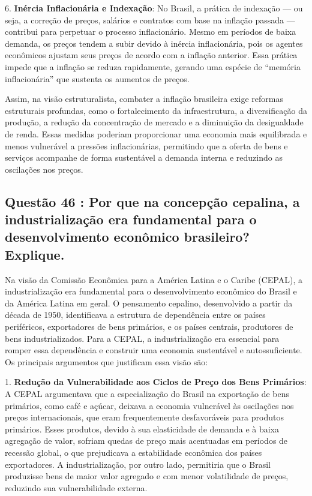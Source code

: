 \documentclass[a4paper,12pt]{article}[abntex2]
\begin{document}
6. \textbf{Inércia Inflacionária e Indexação}: No Brasil, a prática de indexação — ou seja, a correção de preços, salários e contratos com base na inflação passada — contribui para perpetuar o processo inflacionário. Mesmo em períodos de baixa demanda, os preços tendem a subir devido à inércia inflacionária, pois os agentes econômicos ajustam seus preços de acordo com a inflação anterior. Essa prática impede que a inflação se reduza rapidamente, gerando uma espécie de “memória inflacionária” que sustenta os aumentos de preços.

Assim, na visão estruturalista, combater a inflação brasileira exige reformas estruturais profundas, como o fortalecimento da infraestrutura, a diversificação da produção, a redução da concentração de mercado e a diminuição da desigualdade de renda. Essas medidas poderiam proporcionar uma economia mais equilibrada e menos vulnerável a pressões inflacionárias, permitindo que a oferta de bens e serviços acompanhe de forma sustentável a demanda interna e reduzindo as oscilações nos preços.

\subsection{\textbf{Questão 46 : Por que na concepção cepalina, a industrialização era fundamental para o desenvolvimento econômico brasileiro? Explique.}}

Na visão da Comissão Econômica para a América Latina e o Caribe (CEPAL), a industrialização era fundamental para o desenvolvimento econômico do Brasil e da América Latina em geral. O pensamento cepalino, desenvolvido a partir da década de 1950, identificava a estrutura de dependência entre os países periféricos, exportadores de bens primários, e os países centrais, produtores de bens industrializados. Para a CEPAL, a industrialização era essencial para romper essa dependência e construir uma economia sustentável e autossuficiente. Os principais argumentos que justificam essa visão são:

1. \textbf{Redução da Vulnerabilidade aos Ciclos de Preço dos Bens Primários}: A CEPAL argumentava que a especialização do Brasil na exportação de bens primários, como café e açúcar, deixava a economia vulnerável às oscilações nos preços internacionais, que eram frequentemente desfavoráveis para produtos primários. Esses produtos, devido à sua elasticidade de demanda e à baixa agregação de valor, sofriam quedas de preço mais acentuadas em períodos de recessão global, o que prejudicava a estabilidade econômica dos países exportadores. A industrialização, por outro lado, permitiria que o Brasil produzisse bens de maior valor agregado e com menor volatilidade de preços, reduzindo sua vulnerabilidade externa.
\end{document}
